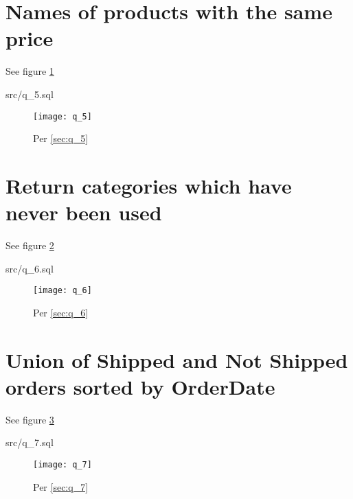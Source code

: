 \documentclass{article}
\begin{document}
\section{Names of products with the same price}
See figure \ref{fig:q_5}
\label{sec:q_5}
\begin{lstinputlisting}[float]{src/q_5.sql}
\end{lstinputlisting}
\begin{figure}[H]\centering
	\caption{Per \ref{sec:q_5}}
	\texttt{[image: q\_5]}
	\label{fig:q_5}
\end{figure}

\section{Return categories which have never been used}
See figure \ref{fig:q_6}
\label{sec:q_6}
\begin{lstinputlisting}[float]{src/q_6.sql}
\end{lstinputlisting}
\begin{figure}[H]\centering
	\caption{Per \ref{sec:q_6}}
	\texttt{[image: q\_6]}
	\label{fig:q_6}
\end{figure}

\section{Union of Shipped and Not Shipped orders sorted by OrderDate}
See figure \ref{fig:q_7}
\label{sec:q_7}
\begin{lstinputlisting}[float]{src/q_7.sql}
\end{lstinputlisting}
\begin{figure}[H]\centering
	\caption{Per \ref{sec:q_7}}
	\texttt{[image: q\_7]}
	\label{fig:q_7}
\end{figure}
\end{document}
